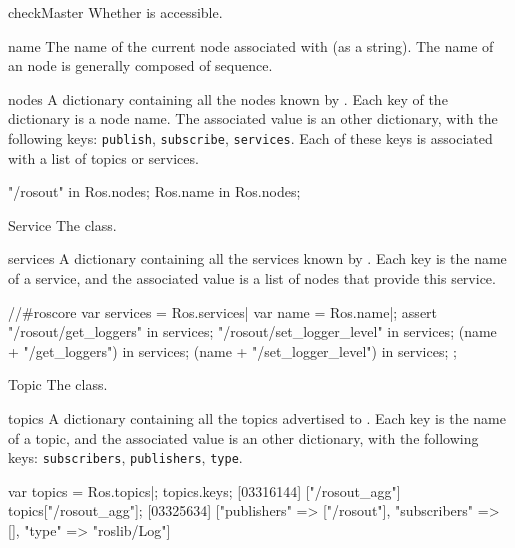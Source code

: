 \begin{urbiscriptapi}
\item[checkMaster]
  Whether  is accessible.

\item[name] The name of the current node associated with \urbi (as a
  string).  The name of an \urbi node is generally composed of
   sequence.

\item[nodes]%
  A dictionary containing all the nodes known by . Each key
  of the dictionary is a node name. The associated value is an other
  dictionary, with the following keys: \lstinline{publish},
  \lstinline{subscribe}, \lstinline{services}.  Each of these keys is
  associated with a list of topics or services.
\begin{urbiassert}
"/rosout" in Ros.nodes;
Ros.name in Ros.nodes;
\end{urbiassert}


\item[Service]%
  The  class.

\item[services]%
  A dictionary containing all the services known by . Each
  key is the name of a service, and the associated value is a list of nodes
  that provide this service.
\begin{urbiscript}
//#roscore
var services = Ros.services|
var name = Ros.name|;
assert
{
         "/rosout/get_loggers" in services;
    "/rosout/set_logger_level" in services;
       (name + "/get_loggers") in services;
  (name + "/set_logger_level") in services;
};
\end{urbiscript}

\item[Topic]%
  The  class.

\item[topics]%
  A dictionary containing all the topics advertised to
  . Each key is the name of a topic, and the associated
  value is an other dictionary, with the following keys:
  \lstinline{subscribers}, \lstinline{publishers}, \lstinline{type}.
\begin{urbiscript}
var topics = Ros.topics|;
topics.keys;
[03316144] ["/rosout_agg"]
topics["/rosout_agg"];
[03325634] ["publishers" => ["/rosout"], "subscribers" => [], "type" => "roslib/Log"]
\end{urbiscript}
\end{urbiscriptapi}


